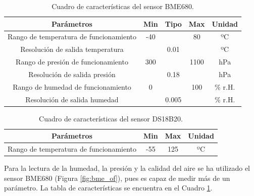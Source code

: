 \begin{table}[H]
\begin{center}
\begin{tabular}{|c|c|c|c|c|}
\hline
\textbf{Parámetros} & \textbf{Min}  & \textbf{Tipo}  & \textbf{Max}  & \textbf{Unidad}\\
\hline
Rango de temperatura de funcionamiento & -40 &  & 80 & ºC \\
Resolución de salida temperatura &  & 0.01 &  &ºC \\
Rango de presión de funcionamiento & 300 &  & 1100 & hPa \\
Resolución de salida presión &  & 0.18 &  &hPa \\
Rango de humedad de funcionamiento & 0 &  & 100 & \% r.H. \\
Resolución de salida humedad &  & 0.005 &  &\% r.H.  \\
\hline
\end{tabular}
\caption{Cuadro de características del sensor BME680.}
\label{cuadro:bme_tabla}
\end{center}
\end{table}

\begin{table}[H]
\begin{center}
\begin{tabular}{|c|c|c|c|}
\hline
\textbf{Parámetros} & \textbf{Min} & \textbf{Max}  & \textbf{Unidad}\\
\hline
Rango de temperatura de funcionamiento  & -55 & 125 & ºC \\
\hline
\end{tabular}
\caption{Cuadro de características del sensor DS18B20.}
\label{cuadro:ds_tabla}
\end{center}
\end{table}

Para la lectura de la humedad, la presión y la calidad del aire se ha utilizado el sensor BME680 (Figura \ref{fig:bme_of}), pues es capaz de medir más de un parámetro. La tabla de características se encuentra en el Cuadro \ref{cuadro:bme_tabla}.\\

